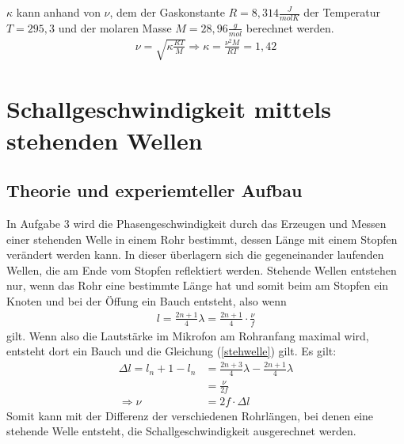 \documentclass[11pt, a4paper]{article}
\begin{document}
    $\kappa$ kann anhand von $\nu$, dem der Gaskonstante $R = 8,314 \frac{J}{molK}$ der Temperatur $T=295,3$ und der molaren Masse $M=28,96\frac{g}{mol}$ berechnet werden.
    \begin{align}
        \nu = \sqrt{\kappa \frac{RT}{M}} \Rightarrow \kappa = \frac{\nu^2 M}{RT}=1,42
    \end{align}

    \section{Schallgeschwindigkeit mittels stehenden Wellen}

    \subsection{Theorie und experiemteller Aufbau}
    In Aufgabe 3 wird die Phasengeschwindigkeit durch das Erzeugen und Messen 
    einer stehenden Welle in einem Rohr bestimmt, dessen Länge mit einem Stopfen verändert werden kann.
    In dieser überlagern sich die gegeneinander laufenden Wellen,
    die  am Ende vom Stopfen reflektiert werden. Stehende Wellen entstehen nur, wenn das Rohr eine bestimmte Länge hat
    und somit beim am Stopfen ein Knoten und bei der Öffung ein Bauch entsteht, also wenn
    \begin{align} \label{stehwelle}
        l = \frac{2n+1}{4} \lambda = \frac{2n + 1}{4} \cdot \frac{\nu}{f}
    \end{align}
    gilt. Wenn also die Lautstärke im Mikrofon am Rohranfang maximal wird, entsteht dort ein Bauch und die Gleichung
    (\ref{stehwelle}) gilt. Es gilt: 
    \begin{align} \label{sch3}
        \Delta l = l_n+1 - l_n &= \frac{2n+3}{4} \lambda - \frac{2n+1}{4} \lambda \nonumber \\
        &= \frac{\nu}{2f} \nonumber \\
         \Rightarrow \nu &= 2f \cdot \Delta l
    \end{align}
    Somit kann mit der Differenz der verschiedenen Rohrlängen, bei denen eine stehende Welle 
    entsteht, die Schallgeschwindigkeit ausgerechnet werden.
\end{document}
